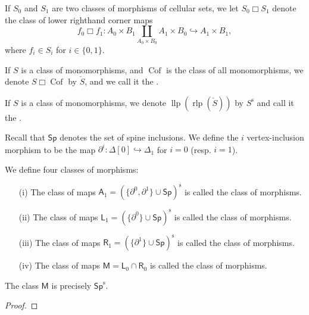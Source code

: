 \begin{defn} If \(S_0\) and \(S_1\) are two classes of morphisms of cellular sets, we let \(S_0 \Box S_1\) denote the class of lower righthand corner maps \[f_0\Box f_1: A_0 \times B_1 \coprod_{A_0\times B_0} A_1 \times B_0 \hookrightarrow A_1\times B_1,\] where \(f_i \in S_i\) for \(i\in \{0,1\}\).   

If \(S\) is a class of monomorphisms, and \(\operatorname{Cof}\) is the class of all monomorphisms, we denote \(S\Box \operatorname{Cof}\) by \(\check{S}\), and we call it the .  
\end{defn} 

\begin{defn} If \(S\) is a class of monomorphisms, we denote \(\operatorname{llp}(\operatorname{rlp}(\check{S}))\) by \(S^{\operatorname{s}}\) and call it the .  
\end{defn}

\begin{defn} Recall that \(\mathsf{Sp}\) denotes the set of spine inclusions.  We define the \(i\) vertex-inclusion morphism to be the map \(\partial^{i}:\Delta[0]\hookrightarrow \Delta_1\) for \(i=0\)  (resp. \(i=1\)). 

We define four classes of morphisms:
\begin{enumerate}
\item[(i)] The class of maps \(\mathsf{A}_1=(\{\partial^{0},\partial^{1}\}\cup \mathsf{Sp})^{\operatorname{s}}\) is called the class of  morphisms.
\item[(ii)] The class of maps \(\mathsf{L}_1=(\{\partial^{0}\}\cup \mathsf{Sp})^{\operatorname{s}}\) is called the class of  morphisms.
\item[(iii)] The class of maps \(\mathsf{R}_1=(\{\partial^{1}\}\cup \mathsf{Sp})^{\operatorname{s}}\) is called the class of  morphisms.
\item[(iv)] The class of maps \(\mathsf{M}=\mathsf{L}_0 \cap \mathsf{R}_0\) is called the class of  morphisms.
\end{enumerate}
\end{defn}

\begin{lemma} The class \(\mathsf{M}\) is precisely \(\mathsf{Sp}^{\operatorname{s}}\).
\end{lemma}
\begin{proof} 
\end{proof}

